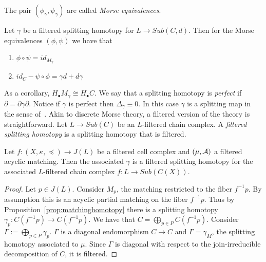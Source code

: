  The pair $(\phi_\gamma,\psi_\gamma)$ are called {\em Morse equivalences}.

\begin{prop}\label{prop:MorseEquiv}
Let $\gamma$ be a filtered splitting homotopy for $L\to Sub(C,d)$.  Then for the Morse equivalences $(\phi,\psi)$ we have that 
\begin{enumerate}
\item $\phi\circ \psi = id_{M_\gamma}$
\item $id_C - \psi\circ \phi = \gamma d + d \gamma$
\end{enumerate}
\end{prop}


As a corollary, $H_\bullet M_\gamma\cong H_\bullet C$.  We say that a splitting homotopy is {\em perfect} if $\partial = \partial\gamma\partial$.  Notice if $\gamma$ is perfect then $\Delta_\gamma\equiv 0$.  In this case $\gamma$ is a splitting map in the sense of~\cite[Ex. 1.4.2]{weibel}.   Akin to discrete Morse theory, a filtered version of the theory is straightforward.  Let $L\to Sub(C)$ be an $L$-filtered chain complex.  A {\em filtered splitting homotopy} is a splitting homotopy that is filtered.


\begin{prop}
Let $f:(X,\kappa,\preceq)\to J(L)$ be a filtered cell complex and $(\mu,{\mathcal A})$ a filtered acyclic matching.  Then the associated $\gamma$ is a filtered splitting homotopy for the associated $L$-filtered chain complex $f:L\to Sub(C(X))$.
\end{prop}
\begin{proof}
Let $p\in J(L)$.  Consider $M_p$, the matching restricted to the fiber $f^{-1}p$.  By assumption this is an acyclic partial matching on the fiber $f^{-1}p$.  Thus by Proposition~\ref{prop:matchinghomotopy} there is a splitting homotopy $\gamma_p:C(f^{-1}p)\to C(f^{-1}p)$.     We have that $C=\bigoplus_{p\in P} C(f^{-1}p)$.  Consider $\Gamma:= \bigoplus_{p\in P} \gamma_p$.  $\Gamma$ is a diagonal endomorphism $C\to C$ and $\Gamma=\gamma_M$, the splitting homotopy associated to $\mu$.  Since $\Gamma$ is diagonal with respect to the join-irreducible decomposition of $C$, it is filtered.

\end{proof}


